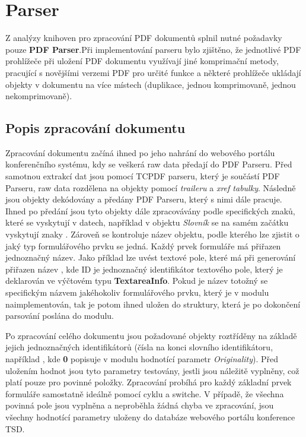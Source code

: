\section{Parser}
Z analýzy knihoven pro zpracování PDF dokumentů splnil nutné požadavky pouze \textbf{PDF Parser}.Při implementování parseru bylo zjištěno, že jednotlivé PDF prohlížeče při uložení PDF dokumentu využívají jiné komprimační metody, pracující s novějšími verzemi PDF pro určité funkce a některé prohlížeče ukládají objekty v dokumentu na více místech (duplikace, jednou komprimovaně, jednou nekomprimovaně).

\subsection{Popis zpracování dokumentu}
Zpracování dokumentu začíná ihned po jeho nahrání do webového portálu konferenčního systému, kdy se veškerá raw data předají do PDF Parseru. Před samotnou extrakcí dat jsou pomocí TCPDF parseru, který je součástí PDF Parseru, raw data rozdělena na objekty pomocí \textit{traileru} a \textit{xref tabulky}. Následně jsou objekty dekódovány a předány PDF Parseru, který s nimi dále pracuje. Ihned po předání jsou tyto objekty dále zpracovávány podle specifických znaků, které se vyskytují v datech, například v objektu \textit{Slovník} se na samém začátku vyskytují znaky \uv{<<}. Zároveň se kontroluje název objektu, podle kterého lze zjistit o jaký typ formulářového prvku se jedná. Každý prvek formuláře má přiřazen jednoznačný název. Jako příklad lze uvést textové pole, které má při generování přiřazen název , kde ID je jednoznačný identifikátor textového pole, který je deklarován ve výčtovém typu \textbf{TextareaInfo}. Pokud je název totožný se specifickým názvem jakéhokoliv formulářového prvku, který je v modulu naimplementován, tak je potom ihned uložen do struktury, která je po dokončení parsování poslána do modulu. 
\par
Po zpracování celého dokumentu jsou požadované objekty roztříděny na základě jejich jednoznačných identifikátorů (čísla na konci slovního identifikátoru, například , kde \textbf{0} popisuje v modulu hodnotící parametr \textit{Originality}). Před uložením hodnot jsou tyto parametry testovány, jestli jsou náležitě vyplněny, což platí pouze pro povinné položky. Zpracování probíhá pro každý základní prvek formuláře samostatně ideálně pomocí cyklu a switche. V případě, že všechna povinná pole jsou vyplněna a neproběhla žádná chyba ve zpracování, jsou všechny hodnotící parametry uloženy do databáze webového portálu konference TSD.
